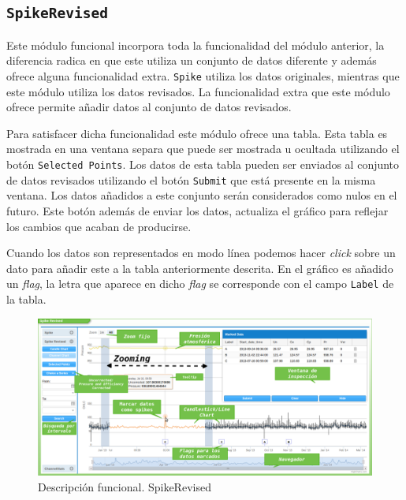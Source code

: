 	\subsection{\texttt{SpikeRevised}}
		Este módulo funcional incorpora toda la funcionalidad del módulo anterior, la diferencia radica en que este utiliza un conjunto de
		datos diferente y además ofrece alguna funcionalidad extra. \texttt{Spike} utiliza los datos originales, mientras que este módulo
		utiliza los datos revisados. La funcionalidad extra que este módulo ofrece permite añadir datos al conjunto de datos revisados.
		\par
		Para satisfacer dicha funcionalidad este módulo ofrece una tabla. Esta tabla es mostrada en una ventana separa que puede ser mostrada
		u ocultada utilizando el botón \texttt{Selected Points}. Los datos de esta tabla pueden ser enviados al conjunto de datos revisados
		utilizando el botón \texttt{Submit} que está presente en la misma ventana. Los datos añadidos a este conjunto serán considerados como
		nulos en el futuro. Este botón además de enviar los datos, actualiza el gráfico para reflejar los cambios que acaban de producirse.
		\par
		Cuando los datos son representados en modo línea podemos hacer \emph{click} sobre un dato para añadir este a la tabla anteriormente
		descrita. En el gráfico es añadido un \emph{flag}, la letra que aparece en dicho \emph{flag} se corresponde con el campo
		\texttt{Label} de la tabla.
		\begin{figure}[h]
			\centering
			\includegraphics[keepaspectratio, width=1\textwidth]{./img/spikeRevised.png}
			\caption{Descripción funcional. SpikeRevised}   
			\label{fig:spikeRevised}
		\end{figure}
